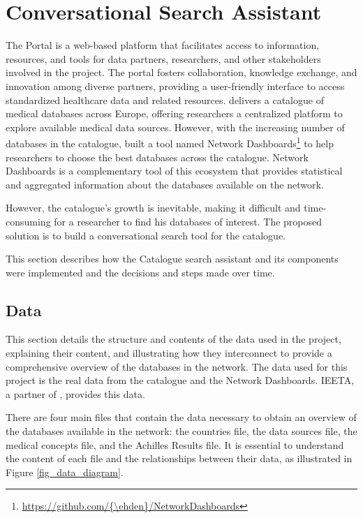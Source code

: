 \chapter{Conversational Search Assistant}
\label{chapter:ConversationalSearchAssistant}


The {\ehden} Portal is a web-based platform that facilitates access to information, resources, and tools for data partners, researchers, and other stakeholders involved in the {\ehden} project. The portal fosters collaboration, knowledge exchange, and innovation among diverse partners, providing a user-friendly interface to access standardized healthcare data and related resources. {\ehden} delivers a catalogue of medical databases across Europe, offering researchers a centralized platform to explore available medical data sources. However, with the increasing number of databases in the catalogue, {\ehden} built a tool named Network Dashboards\footnote{\url{https://github.com/{\ehden}/NetworkDashboards}} to help researchers to choose the best databases across the catalogue. {\ehden} Network Dashboards is a complementary tool of this ecosystem that provides statistical and aggregated information about the databases available on the network. 

However, the catalogue's growth is inevitable, making it difficult and time-consuming for a researcher to find his databases of interest. The proposed solution is to build a conversational search tool for the {\ehden} catalogue.

This section describes how the {\ehden} Catalogue search assistant and its components were implemented and the decisions and steps made over time.

\section{Data}
\label{data}

This section details the structure and contents of the data used in the project, explaining their content, and illustrating how they interconnect to provide a comprehensive overview of the databases in the {\ehden} network. The data used for this project is the real {\ehden} data from the catalogue and the Network Dashboards. IEETA, a partner of {\ehden}, provides this data.

There are four main files that contain the data necessary to obtain an overview of the databases available in the {\ehden} network: the countries file, the data sources file, the medical concepts file, and the Achilles Results file. It is essential to understand the content of each file and the relationships between their data, as illustrated in Figure \ref{fig_data_diagram}.

